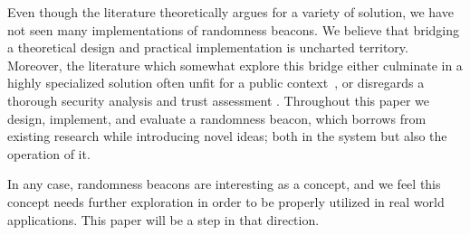 Even though the literature theoretically argues for a variety of solution, we have not seen many implementations of randomness beacons.
We believe that bridging a theoretical design and practical implementation is uncharted territory.
Moreover, the literature which somewhat explore this bridge either culminate in a highly specialized solution often unfit for a public context~\cite{syta2017scalable,cascudo2017scrape}, or disregards a thorough security analysis and trust assessment .
Throughout this paper we design, implement, and evaluate a randomness beacon, which borrows from existing research while introducing novel ideas; both in the system but also the operation of it.

In any case, randomness beacons are interesting as a concept, and we feel this concept needs further exploration in order to be properly utilized in real world applications. This paper will be a step in that direction.


